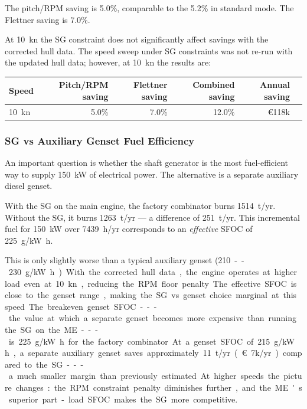 \documentclass[a4paper,11pt]{article}
\begin{document}
The pitch/RPM saving is 5.0\%, comparable to the 5.2\% in
standard mode.  The Flettner saving is 7.0\%.

At \SI{10}{\knot} the SG constraint does not significantly affect savings with
the corrected hull data.  The speed sweep under SG constraints was not re-run
with the updated hull data; however, at \SI{10}{\knot} the results are:

\begin{center}
\begin{tabular}{lrrrrr}
\toprule
Speed & Pitch/RPM saving & Flettner saving & Combined saving & Annual saving\\[0pt]
\midrule
\SI{10}{\knot} & 5.0\% & 7.0\% & 12.0\% & \euro118k\\[0pt]
\bottomrule
\end{tabular}
\end{center}

\subsubsection{SG vs Auxiliary Genset Fuel Efficiency}
\label{sec:org3153ccf}

An important question is whether the shaft generator is the most fuel-efficient
way to supply \SI{150}{\kilo\watt} of electrical power.  The alternative is a
separate auxiliary diesel genset.

With the SG on the main engine, the factory combinator burns \SI{1514}{t/yr}.
Without the SG, it burns \SI{1263}{t/yr} --- a difference of \SI{251}{t/yr}.
This incremental fuel for \SI{150}{\kilo\watt} over \SI{7439}{h/yr} corresponds
to an \emph{effective} SFOC of \SI{225}{\gram/\kilo\watt\hour}.

This is only slightly worse than a typical auxiliary genset (\SI{210}--\SI{230}{\gram/\kilo\watt\hour}).
With the corrected hull data, the engine operates at higher load even at
\SI{10}{\knot}, reducing the RPM floor penalty.  The effective SFOC is close to
the genset range, making the SG vs genset choice marginal at this speed.

The breakeven genset SFOC --- the value at which a separate genset becomes
more expensive than running the SG on the ME --- is \SI{225}{\gram/\kilo\watt\hour}
for the factory combinator.  At a genset SFOC of \SI{215}{\gram/\kilo\watt\hour},
a separate auxiliary genset saves approximately \SI{11}{t/yr}
(\euro7k/yr) compared to the SG --- a much smaller margin than
previously estimated.

At higher speeds the picture changes: the RPM constraint penalty diminishes
further, and the ME's superior part-load SFOC makes the SG more competitive.
\end{document}
